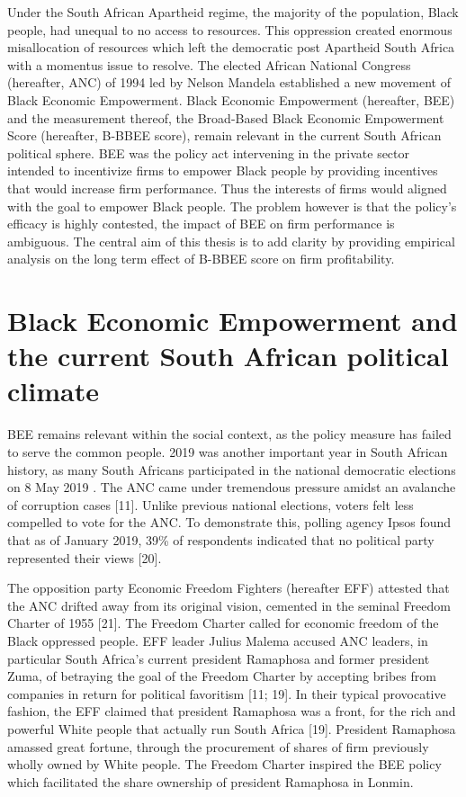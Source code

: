 Under the South African Apartheid regime, the majority of the population, Black people,  had unequal to no access to resources. This oppression created enormous misallocation of resources which left the democratic post Apartheid South Africa with a momentus issue to resolve. The elected African National Congress (hereafter, ANC) of 1994 led by Nelson Mandela established a new movement of Black Economic Empowerment. Black Economic Empowerment (hereafter, BEE) and the measurement thereof, the Broad-Based Black Economic Empowerment Score (hereafter, B-BBEE score), remain relevant in the current South African political sphere. BEE was the policy act intervening in the private sector intended to incentivize firms to empower Black people by providing incentives that would increase firm performance. Thus the interests of firms would aligned with the goal to empower Black people. The problem however is that the policy’s efficacy is highly contested, the impact of BEE on firm performance is ambiguous.  The central aim of this thesis is to add clarity by providing empirical analysis on the long term effect of B-BBEE score on firm profitability.  
\section{Black Economic Empowerment and the current South African political climate}
BEE remains relevant within the social context, as the policy measure has failed to serve the common people. 2019 was another important year in South African history, as many South Africans participated in the national democratic elections on 8 May 2019 \cite[]{N8}. The ANC came under tremendous pressure amidst an avalanche of corruption cases [11]. Unlike previous national elections, voters felt less compelled to vote for the ANC. To demonstrate this, polling agency Ipsos found that as of January 2019, 39\% of respondents indicated that no political party represented their views [20].

The opposition party Economic Freedom Fighters (hereafter EFF) attested that the ANC drifted away from its original vision, cemented in the seminal Freedom Charter of 1955 [21]. The Freedom Charter called for economic freedom of the Black oppressed people. EFF leader Julius Malema accused ANC leaders, in particular South Africa’s current president Ramaphosa and former president Zuma, of betraying the goal of the Freedom Charter by accepting bribes from companies in return for political favoritism [11; 19]. In their typical provocative fashion, the EFF claimed that president Ramaphosa was a front, for the rich and powerful White people that actually run South Africa [19]. President Ramaphosa amassed great fortune, through the procurement of shares of firm previously wholly owned by White people. The Freedom Charter inspired the BEE policy which facilitated the share ownership of president Ramaphosa in Lonmin. 
